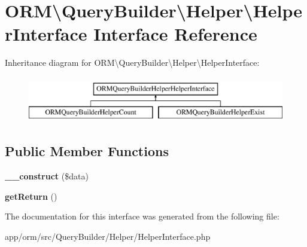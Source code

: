 \hypertarget{interfaceORM_1_1QueryBuilder_1_1Helper_1_1HelperInterface}{}\section{O\+RM\textbackslash{}Query\+Builder\textbackslash{}Helper\textbackslash{}Helper\+Interface Interface Reference}
\label{interfaceORM_1_1QueryBuilder_1_1Helper_1_1HelperInterface}
Inheritance diagram for O\+RM\textbackslash{}Query\+Builder\textbackslash{}Helper\textbackslash{}Helper\+Interface\+:\begin{figure}[H]
\begin{center}
\leavevmode
\includegraphics[height=2.000000cm]{interfaceORM_1_1QueryBuilder_1_1Helper_1_1HelperInterface}
\end{center}
\end{figure}
\subsection*{Public Member Functions}
\begin{DoxyCompactItemize}
\item 
{\bfseries \+\_\+\+\_\+construct} (\$data)\hypertarget{interfaceORM_1_1QueryBuilder_1_1Helper_1_1HelperInterface_a4a0602f6a49bbe0feab9b037393c8a59}{}\label{interfaceORM_1_1QueryBuilder_1_1Helper_1_1HelperInterface_a4a0602f6a49bbe0feab9b037393c8a59}

\item 
{\bfseries get\+Return} ()\hypertarget{interfaceORM_1_1QueryBuilder_1_1Helper_1_1HelperInterface_a8dea6a506c7d4209a23370035eb0356a}{}\label{interfaceORM_1_1QueryBuilder_1_1Helper_1_1HelperInterface_a8dea6a506c7d4209a23370035eb0356a}

\end{DoxyCompactItemize}


The documentation for this interface was generated from the following file\+:\begin{DoxyCompactItemize}
\item 
app/orm/src/\+Query\+Builder/\+Helper/Helper\+Interface.\+php\end{DoxyCompactItemize}
